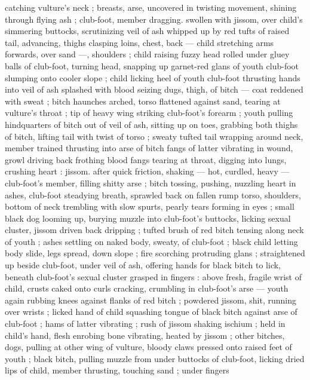 catching vulture's neck ; breasts, arse, uncovered in twisting 
movement, shining through flying ash ; club-foot, member dragging. 
swollen with jissom, over child's simmering buttocks, scrutinizing veil 
of ash whipped up by red tufts of raised tail, advancing, thighs 
clasping loins, chest, back --- child stretching arms forwards, over 
sand ---, shoulders ; child raising fuzzy head rolled under gluey balls 
of club-foot, turning head, snapping up garnet-red glans of youth 
club-foot slumping onto cooler slope ; child licking heel of youth 
club-foot thrusting hands into veil of ash splashed with blood 
seizing dugs, thigh, of bitch --- coat reddened with sweat ; bitch 
haunches arched, torso flattened against sand, tearing at vulture's 
throat ; tip of heavy wing striking club-foot's forearm ; youth pulling 
hindquarters of bitch out of veil of ash, sitting up on toes, grabbing 
both thighs of bitch, lifting tail with twist of torso ; sweaty tufted tail 
wrapping around neck, member trained thrusting into arse of bitch 
fangs of latter vibrating in wound, growl driving back frothing blood 
fangs tearing at throat, digging into lungs, crushing heart : jissom. 
after quick friction, shaking --- hot, curdled, heavy --- club-foot's 
member, filling shitty arse ; bitch tossing, pushing, nuzzling heart in 
ashes, club-foot steadying breath, sprawled back on fallen rump 
torso, shoulders, bottom of neck trembling with slow spurts, pearly 
tears forming in eyes ; small black dog looming up, burying muzzle 
into club-foot's buttocks, licking sexual cluster, jissom driven back 
dripping ; tufted brush of red bitch tensing along neck of youth ; 
ashes settling on naked body, sweaty, of club-foot ; black child 
letting body slide, legs spread, down slope ; fire scorching 
protruding glans ; straightened up beside club-foot, under veil of 
ash, offering hands for black bitch to lick, beneath club-foot's sexual 
cluster grasped in fingers : above fresh, fragile wrist of child, crusts 
caked onto curls cracking, crumbling in club-foot's arse --- youth 
again rubbing knees against flanks of red bitch ; powdered jissom, 
shit, running over wrists ; licked hand of child squashing tongue of 
black bitch against arse of club-foot ; hams of latter vibrating ; rush 
of jissom shaking ischium ; held in child's hand, flesh enrobing bone 
vibrating, heated by jissom ; other bitches, dogs, pulling at other 
wing of vulture, bloody claws pressed onto raised feet of youth ; 
black bitch, pulling muzzle from under buttocks of club-foot, licking 
dried lips of child, member thrusting, touching sand ; under fingers 
